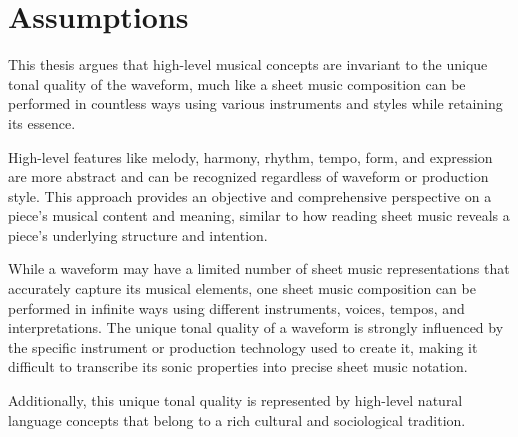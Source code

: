 \section{Assumptions}

This thesis argues that high-level musical concepts are invariant to the unique tonal quality of the waveform, much like a sheet music composition can be performed in countless ways using various instruments and styles while retaining its essence. 

High-level features like melody, harmony, rhythm, tempo, form, and expression are more abstract and can be recognized regardless of waveform or production style. This approach provides an objective and comprehensive perspective on a piece's musical content and meaning, similar to how reading sheet music reveals a piece's underlying structure and intention. 

While a waveform may have a limited number of sheet music representations that accurately capture its musical elements, one sheet music composition can be performed in infinite ways using different instruments, voices, tempos, and interpretations. The unique tonal quality of a waveform is strongly influenced by the specific instrument or production technology used to create it, making it difficult to transcribe its sonic properties into precise sheet music notation. 

Additionally, this unique tonal quality is represented by high-level natural language concepts that belong to a rich cultural and sociological tradition.

